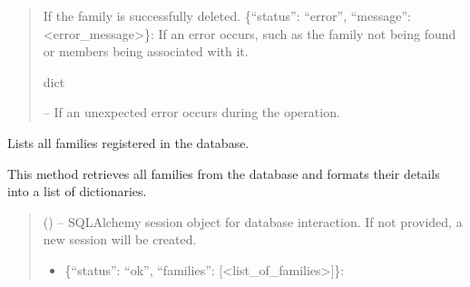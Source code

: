 \documentclass[letterpaper,10pt,english]{sphinxmanual}
\begin{document}
\begin{fulllineitems}
\begin{fulllineitems}
\begin{quote}
\begin{description}
\begin{description}
\begin{itemize}
\end{itemize}

\sphinxAtStartPar
If the family is successfully deleted.
\sphinxhyphen{} \{“status”: “error”, “message”: <error\_message>\}:
If an error occurs, such as the family not being found or members being associated with it.

\end{description}


\sphinxAtStartPar
dict

\sphinxAtStartPar
{} – If an unexpected error occurs during the operation.

\end{description}\end{quote}

\end{fulllineitems}


\begin{fulllineitems}
\label{\detokenize{app.controllers:app.controllers.family_controller.FamilyController.listFamilies}}
\pysigstartsignatures
\pysiglinewithargsret
{}
{}
{}
\pysigstopsignatures
\sphinxAtStartPar
Lists all families registered in the database.

\sphinxAtStartPar
This method retrieves all families from the database and formats their details
into a list of dictionaries.
\begin{quote}\begin{description}
\sphinxAtStartPar
{} (\sphinxstyleliteralemphasis{\sphinxupquote{, }}) – SQLAlchemy session object for database interaction.
If not provided, a new session will be created.

\sphinxAtStartPar
\begin{description}
\begin{itemize}
\item {} 
\sphinxAtStartPar
\{“status”: “ok”, “families”: {[}<list\_of\_families>{]}\}:


\end{itemize}
\end{description}
\end{description}
\end{quote}
\end{fulllineitems}
\end{fulllineitems}
\end{document}
